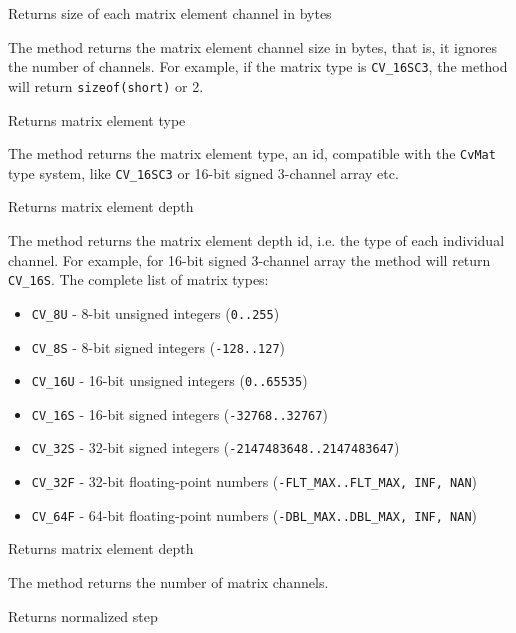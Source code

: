 Returns size of each matrix element channel in bytes


The method returns the matrix element channel size in bytes, that is, it ignores the number of channels. For example, if the matrix type is \texttt{CV\_16SC3}, the method will return \texttt{sizeof(short)} or 2.

Returns matrix element type


The method returns the matrix element type, an id, compatible with the \texttt{CvMat} type system, like \texttt{CV\_16SC3} or 16-bit signed 3-channel array etc.

Returns matrix element depth


The method returns the matrix element depth id, i.e. the type of each individual channel. For example, for 16-bit signed 3-channel array the method will return \texttt{CV\_16S}. The complete list of matrix types:
\begin{itemize}
\item \texttt{CV\_8U} - 8-bit unsigned integers (\texttt{0..255})
\item \texttt{CV\_8S} - 8-bit signed integers (\texttt{-128..127})
\item \texttt{CV\_16U} - 16-bit unsigned integers (\texttt{0..65535})
\item \texttt{CV\_16S} - 16-bit signed integers (\texttt{-32768..32767})
\item \texttt{CV\_32S} - 32-bit signed integers (\texttt{-2147483648..2147483647})
\item \texttt{CV\_32F} - 32-bit floating-point numbers (\texttt{-FLT\_MAX..FLT\_MAX, INF, NAN})
\item \texttt{CV\_64F} - 64-bit floating-point numbers (\texttt{-DBL\_MAX..DBL\_MAX, INF, NAN})
\end{itemize}

Returns matrix element depth


The method returns the number of matrix channels.

Returns normalized step


